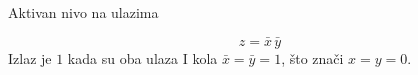 \begin{frame}[label=01-s033]{Aktivan nivo na ulazima}
\centering\par
\[\boxed{z=\bar{x}\,\bar{y}}\]
Izlaz je \(1\) kada su oba ulaza I kola \(\bar{x}=\bar{y}=1\), što znači \(x=y=0\).

\end{frame}
